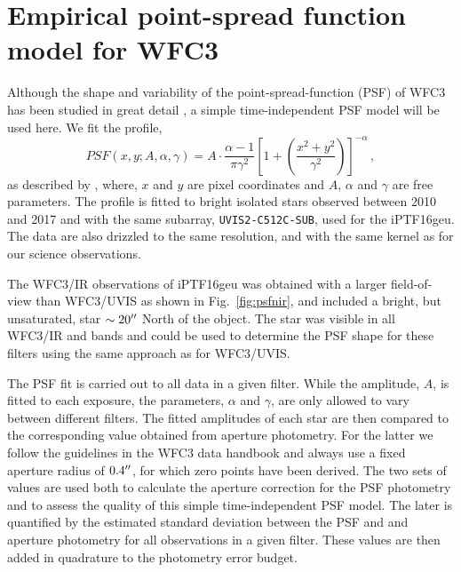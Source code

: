 \documentclass[a4paper,fleqn,usenatbib]{mnras}
\newcommand{\geu}{iPTF16geu\xspace}
\newcommand{\wfc}{WFC3\xspace}
\newcommand{\wfcuvis}{WFC3/UVIS\xspace}
\newcommand{\wfcir}{WFC3/IR\xspace}
\newcommand{\uvisaperture}{{\tt UVIS2-C512C-SUB}\xspace}
\begin{document}
\section{Empirical point-spread function model for \wfc}
\label{sec:wfcpsf}
Although the shape and variability of the point-spread-function (PSF) of \wfc has been studied in great detail 
\citep{2016wfc..rept...12A,2017arXiv170600386A}, a simple time-independent PSF model will be used here.  
We fit the profile,
\[
	PSF(x,y;A,\alpha,\gamma) = A\cdot \frac{\alpha - 1}{\pi\gamma^2}\left[1 + \left(\frac{x^2 + y^2}{\gamma^2}\right)\right]^{-\alpha}\,,
\]
as described by \citet{1969A&A.....3..455M},  where, $x$ and $y$ are pixel coordinates and $A$, $\alpha$ and $\gamma$ are 
free parameters.  The profile is fitted to bright isolated stars observed between 2010 and 2017 and with the same subarray, 
\uvisaperture, used for the \geu.  The data are also drizzled to the same resolution, and with the same kernel as for our science 
observations.  

The \wfcir observations of \geu was obtained with a larger field-of-view than \wfcuvis as shown in Fig.~\ref{fig:psfnir}, and 
included a bright, but unsaturated, star $\sim20\hbox{$^{\prime\prime}$}$ North of the object.  The star was visible in all \wfcir and bands and
could be used to determine the PSF shape for these filters using the same approach as for \wfcuvis. 

The PSF fit is carried out to all data in a given filter.  While the amplitude, $A$, is fitted to each exposure, the parameters, 
$\alpha$ and $\gamma$, are only allowed to vary between different filters.   The fitted amplitudes of each star are then compared to the 
corresponding value obtained from aperture photometry.  For the latter we follow the guidelines in the \wfc data handbook 
\citep{wfc3handbook} and always use a fixed aperture radius of $0.4\hbox{$^{\prime\prime}$}$, for which zero points have been derived.  
The two sets of values are used both to calculate the aperture correction for the PSF photometry and to assess the quality of this simple 
time-independent PSF model.  The later is quantified by the estimated standard deviation between the PSF and and aperture
photometry for all observations in a given filter.  These values are then added in quadrature to the photometry error budget.
\end{document}
